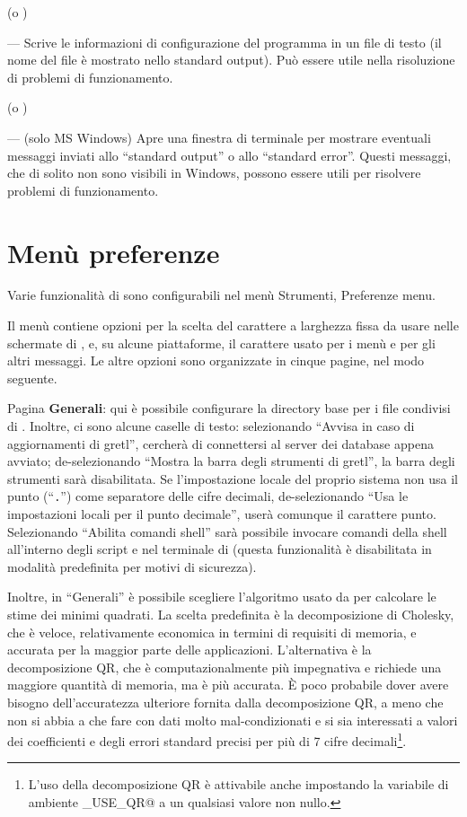  (o )
      
--- Scrive le informazioni di configurazione del programma in un file
di testo (il nome del file è mostrato nello standard output). Può
essere utile nella risoluzione di problemi di funzionamento.
      
 (o )
      
--- (solo MS Windows) Apre una finestra di terminale per mostrare
eventuali messaggi inviati allo ``standard output'' o allo ``standard
error''. Questi messaggi, che di solito non sono visibili in Windows,
possono essere utili per risolvere problemi di funzionamento.
      
\section{Menù preferenze}
\label{guiprefs}

Varie funzionalità di  sono configurabili nel menù
\textsf{Strumenti, Preferenze} menu.
      
Il menù contiene opzioni per la scelta del carattere a larghezza fissa
da usare nelle schermate di , e, su alcune piattaforme, il
carattere usato per i menù e per gli altri messaggi.  Le altre opzioni
sono organizzate in cinque pagine, nel modo seguente.
      
Pagina \textbf{Generali}: qui è possibile configurare la directory
base per i file condivisi di .  Inoltre, ci sono alcune
caselle di testo: selezionando ``Avvisa in caso di aggiornamenti di
gretl'',  cercherà di connettersi al server dei database
appena avviato; de-selezionando ``Mostra la barra degli strumenti di
gretl'', la barra degli strumenti sarà disabilitata.  Se
l'impostazione locale del proprio sistema non usa il punto
(``\texttt{.}'') come separatore delle cifre decimali, de-selezionando
``Usa le impostazioni locali per il punto decimale'', 
userà comunque il carattere punto. Selezionando ``Abilita comandi
shell'' sarà possibile invocare comandi della shell all'interno degli
script e nel terminale di  (questa funzionalità è
disabilitata in modalità predefinita per motivi di sicurezza).
      
Inoltre, in ``Generali'' è possibile scegliere l'algoritmo usato da
 per calcolare le stime dei minimi quadrati. La scelta
predefinita è la decomposizione di Cholesky, che è veloce,
relativamente economica in termini di requisiti di memoria, e accurata
per la maggior parte delle applicazioni. L'alternativa è la
decomposizione QR, che è computazionalmente più impegnativa e richiede
una maggiore quantità di memoria, ma è più accurata.  È poco probabile
dover avere bisogno dell'accuratezza ulteriore fornita dalla
decomposizione QR, a meno che non si abbia a che fare con dati molto
mal-condizionati e si sia interessati a valori dei coefficienti e
degli errori standard precisi per più di 7 cifre
decimali\footnote{L'uso della decomposizione QR è attivabile anche
  impostando la variabile di ambiente \verb@GRETL_USE_QR@ a un
  qualsiasi valore non nullo.}.

